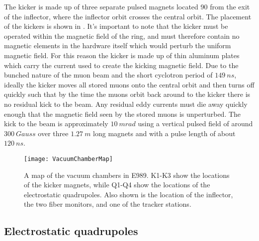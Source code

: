 The kicker is made up of three separate pulsed magnets located 90\textdegree{} from the exit of the inflector, where the inflector orbit crosses the central orbit. The placement of the kickers is shown in . It's important to note that the kicker must be operated within the magnetic field of the ring, and must therefore contain no magnetic elements in the hardware itself which would perturb the uniform magnetic field. For this reason the kicker is made up of thin aluminum plates which carry the current used to create the kicking magnetic field. Due to the bunched nature of the muon beam and the short cyclotron period of $\SI{149}{ns}$, ideally the kicker moves all stored muons onto the central orbit and then turns off quickly such that by the time the muons orbit back around to the kicker there is no residual kick to the beam. Any residual eddy currents must die away quickly enough that the magnetic field seen by the stored muons is unperturbed. The kick to the beam is approximately $\SI{10}{mrad}$ using a vertical pulsed field of around $\SI{300}{Gauss}$ over three $\SI{1.27}{m}$ long magnets and with a pulse length of about $\SI{120}{ns}$. 




\begin{figure}[]
    \centering
    \texttt{[image: VacuumChamberMap]}
    \caption[Vacuum chamber map]{A map of the vacuum chambers in E989. K1-K3 show the locations of the kicker magnets, while Q1-Q4 show the locations of the electrostatic quadrupoles. Also shown is the location of the inflector, the two fiber monitors, and one of the tracker stations.}   
    \label{fig:vacmap}
\end{figure}

\subsection{Electrostatic quadrupoles}

